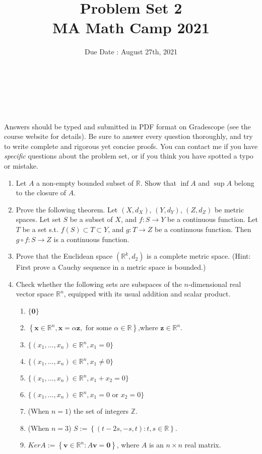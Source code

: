 \documentclass[11pt,letterpaper]{scrartcl}
\title{Problem Set 2 \\ MA Math Camp 2021 }
\author{ Due Date : August 27th, 2021 }
\date{  }
\makeatletter
\newcommand{\reals}{\mathbb{R}}
\let\thetitle\@title
\let\theauthor\@author
\let\thedate\@date
\newcommand\makesimpletitle{%
\noindent 
\textbf{\large \thetitle} \\
\-\ \hspace{.2cm} { \large \theauthor } \\ 
\-\ \hspace{.2cm} { \normalsize \thedate }
}
\makeatother
\begin{document}


\makesimpletitle

Answers should be typed and submitted in PDF format on Gradescope (see the course website for details). Be sure to answer every question thoroughly, and try to write complete and rigorous yet concise proofs. You can contact me if you have \emph{specific} questions about the problem set, or if you think you have spotted a typo or mistake.

\vspace{.5cm}

\begin{enumerate}
	
	\item Let $A$ a non-empty bounded subset of $\reals$. Show that $\inf A$ and $\sup A$ belong to the closure of $A$.

	\item Prove the following theorem. Let $\left(X,d_{X}\right)$, $\left(Y,d_{Y}\right)$, $\left(Z,d_{Z}\right)$ be metric spaces. Let set $S$ be a subset of $X$, and $f:S\to Y$ be a continuous function. Let $T$ be a set s.t. $f\left(S\right)\subset T\subset Y$, and $g:T\to Z$ be a continuous function. Then $g\circ f:S\to Z$ is a continuous function.

	\item Prove that the Euclidean space $\left(\mathbb{R}^{k},d_{2}\right)$ is a complete metric space. (Hint: First prove a Cauchy sequence in a metric space is bounded.)

	\item Check whether the following sets are subspaces of the $n$-dimensional real vector space $\mathbb{R}^{n}$, equipped with its usual addition and scalar product.
		\begin{enumerate}
		\item $\{\mathbf{0}\}$
		\item $\left\{ \mathbf{x} \in\mathbb{R}^{n}, \mathbf{x}=\alpha\mathbf{z},\text{ for some }\alpha\in\mathbb{R}\right\} $,where $\mathbf{z}\in\mathbb{R}^{n}$.
		\item $\{ (x_1,...,x_n) \in \reals^n, x_1 = 0 \}$
		\item $\{ (x_1,...,x_n) \in \reals^n, x_1 \neq 0 \}$
		\item $\{ (x_1,...,x_n) \in \reals^n, x_1 + x_2 = 0 \}$
		\item $\{ (x_1,...,x_n) \in \reals^n, x_1 = 0 \text{ or } x_2 = 0 \}$
		\item (When $n=1$) the set of integers $\mathbb{Z}$.
		\item (When $n=3$) $S:=\left\{ \left(t-2s,-s,t\right):t,s\in\mathbb{R}\right\} $.
		\item $KerA:=\left\{ \mathbf{v}\in\mathbb{R}^{n}:A\mathbf{v}=\mathbf{0}\right\} $,
		where $A$ is an $n\times n$ real matrix.
		\end{enumerate}


\end{enumerate}
\end{document}
